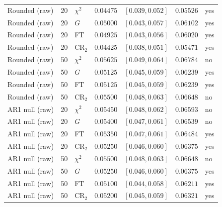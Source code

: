 \begin{table}[t]
\begin{tabular}{lllrrrl}
Rounded (raw) & 20 & $\chi^2$ & $0.04475$ & $[0.039, 0.052]$ & $0.05526$ & yes \\
Rounded (raw) & 20 & $G$ & $0.05000$ & $[0.043, 0.057]$ & $0.06102$ & yes \\
Rounded (raw) & 20 & FT & $0.04925$ & $[0.043, 0.056]$ & $0.06020$ & yes \\
Rounded (raw) & 20 & CR$_2$ & $0.04425$ & $[0.038, 0.051]$ & $0.05471$ & yes \\
Rounded (raw) & 50 & $\chi^2$ & $0.05625$ & $[0.049, 0.064]$ & $0.06784$ & no \\
Rounded (raw) & 50 & $G$ & $0.05125$ & $[0.045, 0.059]$ & $0.06239$ & yes \\
Rounded (raw) & 50 & FT & $0.05125$ & $[0.045, 0.059]$ & $0.06239$ & yes \\
Rounded (raw) & 50 & CR$_2$ & $0.05500$ & $[0.048, 0.063]$ & $0.06648$ & no \\
AR1 null (raw) & 20 & $\chi^2$ & $0.05450$ & $[0.048, 0.062]$ & $0.06593$ & no \\
AR1 null (raw) & 20 & $G$ & $0.05400$ & $[0.047, 0.061]$ & $0.06539$ & no \\
AR1 null (raw) & 20 & FT & $0.05350$ & $[0.047, 0.061]$ & $0.06484$ & yes \\
AR1 null (raw) & 20 & CR$_2$ & $0.05250$ & $[0.046, 0.060]$ & $0.06375$ & yes \\
AR1 null (raw) & 50 & $\chi^2$ & $0.05500$ & $[0.048, 0.063]$ & $0.06648$ & no \\
AR1 null (raw) & 50 & $G$ & $0.05250$ & $[0.046, 0.060]$ & $0.06375$ & yes \\
AR1 null (raw) & 50 & FT & $0.05100$ & $[0.044, 0.058]$ & $0.06211$ & yes \\
AR1 null (raw) & 50 & CR$_2$ & $0.05200$ & $[0.045, 0.059]$ & $0.06321$ & yes \\
\bottomrule
\end{tabular}
\end{table}

